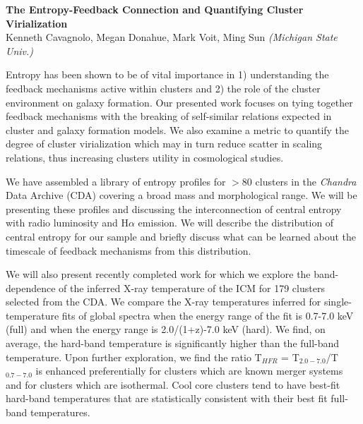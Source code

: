 \documentclass[12pt]{plan}
\begin{document}
\begin{center}
\vspace{1.5mm}
{\bf The Entropy-Feedback Connection and Quantifying Cluster Virialization}\\
Kenneth Cavagnolo, Megan Donahue, Mark Voit, Ming Sun \textit{(Michigan State Univ.)}\\
\vspace{1.5mm}
\end{center}

Entropy has been shown to be of vital importance in 1) understanding the
feedback mechanisms active within clusters and 2) the role of the cluster
environment on galaxy formation. Our presented work focuses on tying
together feedback mechanisms with the breaking of self-similar relations
expected in cluster and galaxy formation models. We also examine a metric
to quantify the degree of cluster virialization which may in turn
reduce scatter in scaling relations, thus increasing clusters utility
in cosmological studies.

We have assembled a library of entropy profiles for $> 80$ clusters in
the \textit{Chandra} Data Archive (CDA) covering a broad mass and
morphological range. We will be presenting these profiles and
discussing the interconnection of central entropy with radio
luminosity and H$\alpha$ emission. We will describe the distribution of
central entropy for our sample and briefly discuss what can be learned
about the timescale of feedback mechanisms from this distribution.

We will also present recently completed work for which we explore the
band-dependence of the inferred X-ray temperature of the ICM for 179
clusters selected from the CDA. We compare the X-ray temperatures
inferred for single-temperature fits of global spectra when the energy
range of the fit is 0.7-7.0 keV (full) and when the energy range is
2.0/(1+z)-7.0 keV (hard). We find, on average, the hard-band
temperature is significantly higher than the full-band
temperature. Upon further exploration, we find the ratio T$_{HFR}$ =
T$_{2.0-7.0}$/T$_{0.7-7.0}$ is enhanced preferentially for clusters
which are known merger systems and for clusters which are
isothermal. Cool core clusters tend to have best-fit hard-band
temperatures that are statistically consistent with their best fit
full-band temperatures.
\end{document}
